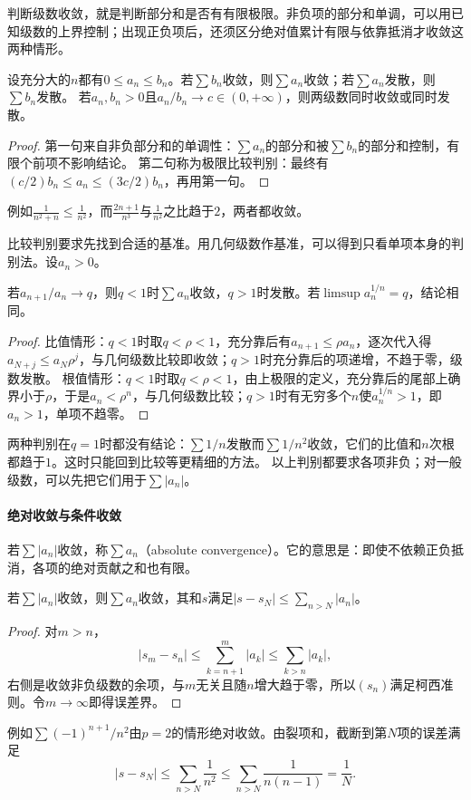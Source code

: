 判断级数收敛，就是判断部分和是否有有限极限。非负项的部分和单调，可以用已知级数的上界控制；出现正负项后，还须区分绝对值累计有限与依靠抵消才收敛这两种情形。

\begin{theorem}[正项级数的比较判别]
\label{thm:ru-series-comparison}
设充分大的$n$都有$0\leq a_n\leq b_n$。若$\sum b_n$收敛，则$\sum a_n$收敛；若$\sum a_n$发散，则$\sum b_n$发散。
若$a_n,b_n>0$且$a_n/b_n\to c\in(0,+\infty)$，则两级数同时收敛或同时发散。
\end{theorem}
\begin{proof}
第一句来自非负部分和的单调性：$\sum a_n$的部分和被$\sum b_n$的部分和控制，有限个前项不影响结论。
第二句称为极限比较判别：最终有$(c/2)b_n\leq a_n\leq(3c/2)b_n$，再用第一句。
\end{proof}
例如$\frac{1}{n^2+n}\leq\frac1{n^2}$，而$\frac{2n+1}{n^3}$与$\frac1{n^2}$之比趋于$2$，两者都收敛。

比较判别要求先找到合适的基准。用几何级数作基准，可以得到只看单项本身的判别法。设$a_n>0$。
\begin{theorem}[比值判别与根值判别]
\label{thm:ru-ratio-root-tests}
若$a_{n+1}/a_n\to q$，则$q<1$时$\sum a_n$收敛，$q>1$时发散。若$\limsup a_n^{1/n}=q$，结论相同。
\end{theorem}
\begin{proof}
比值情形：$q<1$时取$q<\rho<1$，充分靠后有$a_{n+1}\leq\rho a_n$，逐次代入得$a_{N+j}\leq a_N\rho^j$，与几何级数比较即收敛；$q>1$时充分靠后的项递增，不趋于零，级数发散。
根值情形：$q<1$时取$q<\rho<1$，由上极限的定义，充分靠后的尾部上确界小于$\rho$，于是$a_n<\rho^n$，与几何级数比较；$q>1$时有无穷多个$n$使$a_n^{1/n}>1$，即$a_n>1$，单项不趋零。
\end{proof}
两种判别在$q=1$时都没有结论：$\sum1/n$发散而$\sum1/n^2$收敛，它们的比值和$n$次根都趋于$1$。这时只能回到比较等更精细的方法。
以上判别都要求各项非负；对一般级数，可以先把它们用于$\sum|a_n|$。

\paragraph{绝对收敛与条件收敛}
若$\sum|a_n|$收敛，称$\sum a_n$（absolute convergence）。它的意思是：即使不依赖正负抵消，各项的绝对贡献之和也有限。
\begin{theorem}[绝对收敛蕴含收敛]
\label{thm:ru-absolute-convergence}
若$\sum|a_n|$收敛，则$\sum a_n$收敛，其和$s$满足$|s-s_N|\leq\sum_{n>N}|a_n|$。
\end{theorem}
\begin{proof}
对$m>n$，
\[
 |s_m-s_n|\leq\sum_{k=n+1}^m|a_k|\leq\sum_{k>n}|a_k|,
\]
右侧是收敛非负级数的余项，与$m$无关且随$n$增大趋于零，所以$(s_n)$满足柯西准则。令$m\to\infty$即得误差界。
\end{proof}
例如$\sum(-1)^{n+1}/n^2$由$p=2$的情形绝对收敛。由裂项和，截断到第$N$项的误差满足
\[
 |s-s_N|\leq\sum_{n>N}\frac1{n^2}\leq\sum_{n>N}\frac1{n(n-1)}=\frac1N.
\]

